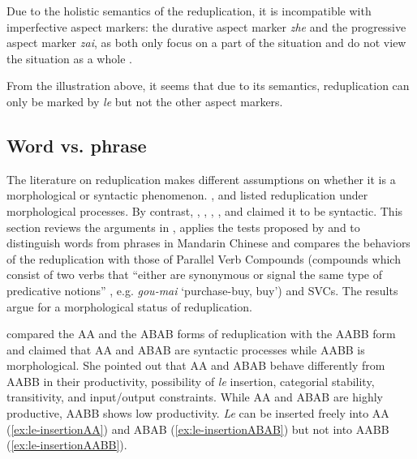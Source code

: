 Due to the holistic semantics of the reduplication, it is incompatible with imperfective aspect markers: the durative aspect marker \textit{zhe} and the progressive aspect marker \textit{zai}, as both only focus on  a part of the situation and do not view the situation as a whole \citep[Ch. 5]{XiaoMcEnery2004}.

From the illustration above, it seems that due to its semantics, reduplication can only be marked by \textit{le} but not the other aspect markers.








\subsection{Word vs. phrase}\label{sec:word}

The literature on reduplication makes different assumptions on whether it is a morphological or syntactic phenomenon.
\citet[Ch. 4]{Chao1968}, \citet[Ch. 3]{LiThompson1981} and \citet[4--5]{Liao2014} listed reduplication under morphological processes. 
By contrast, \citet[23]{Arcodiaetal2014}, \citet{Xiong2016}, \citet[146]{BascianoMelloni2017}, \citet[229--231]{YangWei2017}, \citet[330]{MelloniBasciano2018} and \citet{Xie2020}  claimed it to be syntactic.
This section reviews the arguments in \citet{Xie2020}, applies the tests proposed by \citet{Duanmu1998} and \citet{Schaefer2009} to distinguish words from phrases in Mandarin Chinese 
and compares the behaviors of the reduplication with those of Parallel Verb Compounds 
(compounds which consist of two verbs that ``either are synonymous or signal the same type of predicative notions'' \citep[68]{LiThompson1981}, e.g. \textit{gou-mai} `purchase-buy, buy') and {SVC}s. 
The results argue for a morphological status of reduplication.



\citet{Xie2020} compared the AA and the ABAB forms of reduplication with the AABB form and claimed that AA and ABAB are syntactic processes while AABB is morphological.
She pointed out that AA and ABAB behave differently from AABB in their productivity, possibility of \textit{le} insertion, categorial stability, transitivity, and input/output constraints.
While AA and ABAB are highly productive, AABB shows low productivity. 
\textit{Le} can be inserted freely into AA (\ref{ex:le-insertionAA}) and ABAB (\ref{ex:le-insertionABAB}) but not into AABB (\ref{ex:le-insertionAABB}).

